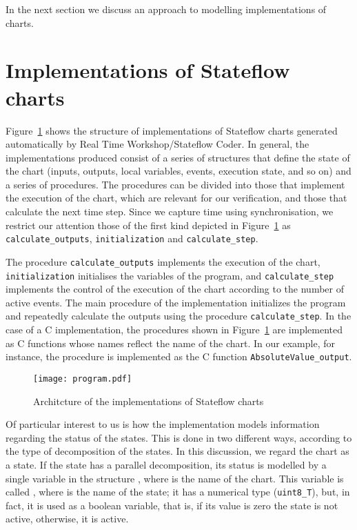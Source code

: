\documentclass[submission]{eptcs}
\begin{document}
In the next section we discuss an approach to modelling implementations of charts.

\section{Implementations of Stateflow charts}
\label{sec:impl}

Figure~\ref{fig:impl} shows the structure of implementations of Stateflow charts generated automatically by Real Time Workshop/Stateflow Coder. In general, the implementations produced consist of a series of structures that define the state of the chart (inputs, outputs, local variables, events, execution state, and so on) and a series of procedures. The procedures can be divided into those that implement the execution of the chart, which are relevant for our verification, and those that calculate the next time step. Since we capture time using synchronisation, we restrict our attention those of the first kind depicted in Figure~\ref{fig:impl} as \texttt{calculate\_outputs}, \texttt{initialization} and \texttt{calculate\_step}.

The procedure \texttt{calculate\_outputs} implements the execution of the chart, \texttt{initialization} initialises the variables of the program, and \texttt{calculate\_step} implements the control of the execution of the chart according to the number of active events. The main procedure of the implementation initializes the program and repeatedly calculate the outputs using the procedure \texttt{calculate\_step}. In the case of a C implementation, the procedures shown in Figure~\ref{fig:impl} are implemented as C functions whose names reflect the name of the chart. In our example, for instance, the procedure  is implemented as the C function \texttt{AbsoluteValue\_output}.

\begin{figure}[t]
\centering
\texttt{[image: program.pdf]}
\caption{Architcture of the implementations of Stateflow charts}
\label{fig:impl}
\end{figure}

Of particular interest to us is how the implementation models information regarding the status of the states. This is done in two different ways, according to the type of
decomposition of the states. In this discussion, we regard the chart as a state. If the state has a parallel decomposition, its status is modelled by a single variable in the structure , where  is the name of the chart. This variable is called , where  is the name of the state; it has a numerical type (\texttt{uint8\_T}), but, in fact, it is used as a boolean variable, that is, if its value is zero the state is not active, otherwise, it is active. 
\end{document}

